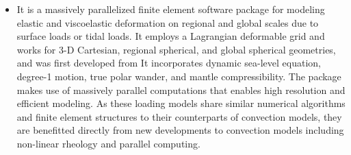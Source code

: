\begin{itemize}
\begin{scriptsize}
\begin{itemize}
\item[\twothousandtwenty]    \textcite{weki20},  \textcite{braf20},  \textcite{pagh20},
                             \textcite{vamg20},  \textcite{heyg20},  \textcite{loru20}, 
                             \textcite{bill20},  \textcite{sele20},
                             \textcite{dazl20},  \textcite{wali20}, 
\item[\twothousandtwentyone] \textcite{cafm21},  \textcite{ligl21},  \textcite{lule21},
                             \textcite{scvg21},  \textcite{ligl21b}, \textcite{maba21},
                             \textcite{wali21},  \textcite{cafb21},  \textcite{mazh21a}
                             \textcite{hulg21},  \textcite{moma21},  \textcite{sabp21},
                             \textcite{mazh21b}
\item[\twothousandtwentytwo] \textcite{limc22},  \textcite{scva22},  \textcite{yuli22},
                             \textcite{flbw22},  \textcite{kibm22},  \textcite{rojy22},
                             \textcite{ghpa22},  \textcite{maba22},  \textcite{peli22},
                             \textcite{fube22}
\item[\twothousandtwentythree] \textcite{li__23}, \textcite{lilz23}, \textcite{bofl23},
                               \textcite{hagl23}, \textcite{wacp23}, \textcite{lilw23},
                               \textcite{zhzl23}, \textcite{li__23}

\end{itemize}
\end{scriptsize}

\item \citcomsve {}

It is a massively parallelized finite element software package for modeling elastic 
and viscoelastic deformation on regional and global scales due to 
surface loads or tidal loads. 
It employs a Lagrangian deformable grid and works for 3-D Cartesian, 
regional spherical, and global spherical geometries, and was first developed from \citcoms
It incorporates dynamic sea-level equation, degree-1 motion, true polar wander, 
and mantle compressibility. The package makes use of massively parallel computations 
that enables high resolution and efficient modeling. 
As these loading models share similar numerical algorithms and finite element 
structures to their counterparts of convection models, they are benefitted directly 
from new developments to convection models including non-linear rheology and parallel computing. 


\end{itemize}
